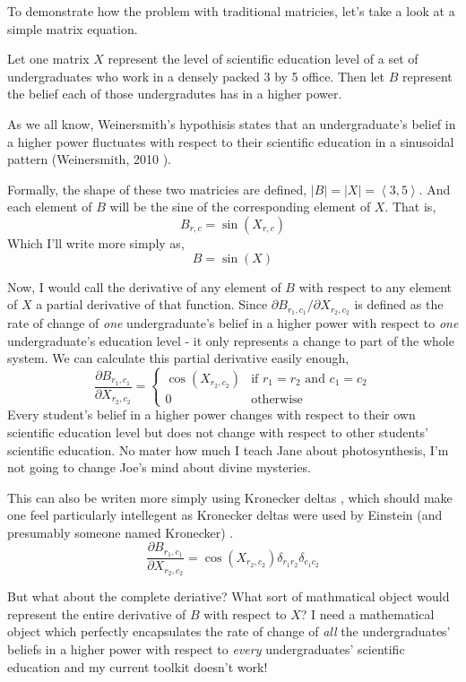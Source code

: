 \documentclass[12pt]{book}
\theoremstyle{plain}
\theoremstyle{definition}
\theoremstyle{ppart}
\theoremstyle{case}
\theoremstyle{solution}
\begin{document}
To demonstrate how the problem with traditional matricies, let's take a look at a
simple matrix equation. 

Let one matrix $X$ represent the level of scientific education level of a set of
undergraduates who work in a densely packed 3 by 5 office.
Then let $B$ represent the belief each of those undergradutes has in a higher power.

As we all know, Weinersmith's hypothisis states that an undergraduate's belief in a
higher power fluctuates with respect to their scientific education in a sinusoidal
pattern (Weinersmith, 2010 \cite{weinersmith:education}).

Formally, the shape of these two matricies are defined,
$|B| = |X| = \left< 3,5 \right>$.
And each element of $B$ will be the sine of the corresponding element of
$X$. That is, \[B_{r,c} = \sin(X_{r,c})\]
Which I'll write more simply as, \[B = \sin(X)\]

Now, I would call the derivative of any element of $B$ with respect to any element
of $X$ a partial derivative of that function. Since
$\partial B_{r_1, c_1}/\partial X_{r_2, c_2}$ is defined as the rate of change of
\textit{one} undergraduate's belief in a higher power with respect to \textit{one}
undergraduate's education level - it only represents a change to part of the whole
system. 
We can calculate this partial derivative easily enough,
\[
\frac{\partial B_{r_1,c_1}}{\partial X_{r_2,c_2}} = 
\left\{
  \begin{array}{ll}
    \cos(X_{r_2,c_2})  & \mbox{if } r_1 = r_2 \mbox{ and } c_1 = c_2 \\
    0 & \mbox{otherwise}
  \end{array}
\right.
\]
Every student's belief in a higher power changes with respect to their own
scientific education level but does not change with respect to other students'
scientific education. No mater how much I teach Jane about photosynthesis, I'm
not going to change Joe's mind about divine mysteries.

This can also be writen more simply using Kronecker deltas \cite{wiki:kronecker},
which should make one feel particularly intellegent as Kronecker deltas were used
by Einstein (and presumably someone named Kronecker) \cite{wiki:einstein}.
\[
\frac{\partial B_{r_1,c_1}}{\partial X_{r_2,c_2}} = 
\cos (X_{r_2, c_2}) \delta_{r_1 r_2} \delta_{c_1 c_2}
\]

But what about the complete deriative?
What sort of mathmatical object would represent the entire derivative
of $B$ with respect to $X$?
I need a mathematical object which perfectly
encapsulates the rate of change of \textit{all} the undergraduates' beliefs in a
higher power with respect to \textit{every} undergraduates' scientific education
and my current toolkit doesn't work!
\end{document}
